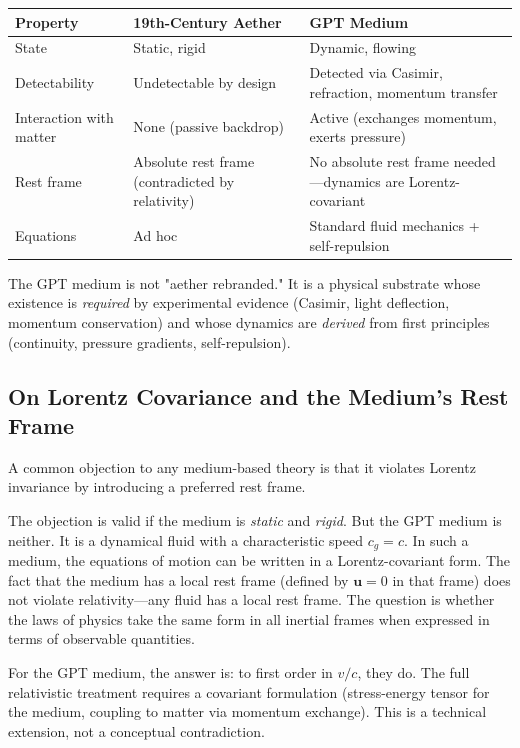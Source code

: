 \documentclass[12pt, a4paper]{article}
\begin{document}
\begin{center}
\begin{tabular}{|p{3.5cm}|p{5cm}|p{5cm}|}
\hline
\textbf{Property} & \textbf{19th-Century Aether} & \textbf{GPT Medium} \\
\hline
State & Static, rigid & Dynamic, flowing \\
\hline
Detectability & Undetectable by design & Detected via Casimir, refraction, momentum transfer \\
\hline
Interaction with matter & None (passive backdrop) & Active (exchanges momentum, exerts pressure) \\
\hline
Rest frame & Absolute rest frame (contradicted by relativity) & No absolute rest frame needed—dynamics are Lorentz-covariant \\
\hline
Equations & Ad hoc & Standard fluid mechanics + self-repulsion \\
\hline
\end{tabular}
\end{center}

The GPT medium is not "aether rebranded." It is a physical substrate whose existence is \textit{required} by experimental evidence (Casimir, light deflection, momentum conservation) and whose dynamics are \textit{derived} from first principles (continuity, pressure gradients, self-repulsion).

\subsection{On Lorentz Covariance and the Medium's Rest Frame}
\label{subsec:lorentz_covariance}

A common objection to any medium-based theory is that it violates Lorentz invariance by introducing a preferred rest frame.

The objection is valid if the medium is \textit{static} and \textit{rigid}. But the GPT medium is neither. It is a dynamical fluid with a characteristic speed \( c_g = c \). In such a medium, the equations of motion can be written in a Lorentz-covariant form. The fact that the medium has a local rest frame (defined by \( \mathbf{u} = 0 \) in that frame) does not violate relativity—any fluid has a local rest frame. The question is whether the laws of physics take the same form in all inertial frames when expressed in terms of observable quantities.

For the GPT medium, the answer is: to first order in \( v/c \), they do. The full relativistic treatment requires a covariant formulation (stress-energy tensor for the medium, coupling to matter via momentum exchange). This is a technical extension, not a conceptual contradiction.
\end{document}
